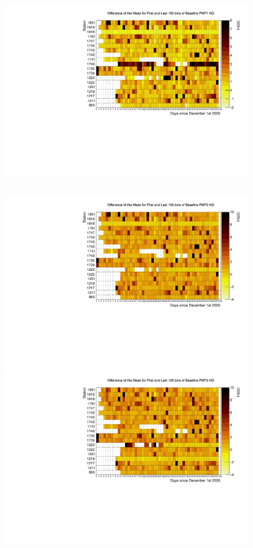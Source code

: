 \documentclass[aspectratio=169]{beamer}
\begin{document}
\begin{frame}
  \centering
  \includegraphics[width=.45\textwidth]{../plots/blPMT1Diffmean100Hg.pdf}\quad%
  \begin{minipage}[b][0.4\textheight][c]{.45\linewidth} \end{minipage}\\[1em]
  \includegraphics[width=.45\textwidth]{../plots/blPMT2Diffmean100Hg.pdf}\quad%
  \includegraphics[width=.45\textwidth]{..//plots/blPMT3Diffmean100Hg.pdf}
\end{frame}
\end{document}
